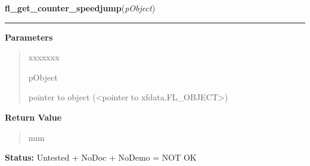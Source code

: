 \hspace{.8\funcindent}\begin{boxedminipage}{\funcwidth}

    \raggedright \textbf{fl\_get\_counter\_speedjump}(\textit{pObject})

    \vspace{-1.5ex}

    \rule{\textwidth}{0.5\fboxrule}
\setlength{\parskip}{2ex}
\setlength{\parskip}{1ex}
      \textbf{Parameters}
      \vspace{-1ex}

      \begin{quote}
        \begin{Ventry}{xxxxxxx}

          \item[pObject]

          pointer to object ({\textless}pointer to 
          xfdata.FL\_OBJECT{\textgreater})

        \end{Ventry}

      \end{quote}

      \textbf{Return Value}
    \vspace{-1ex}

      \begin{quote}
      num

      \end{quote}

\textbf{Status:} Untested + NoDoc + NoDemo = NOT OK



    \end{boxedminipage}

    \label{xformslib:library:fl_set_counter_speedjump}

    \vspace{0.5ex}


